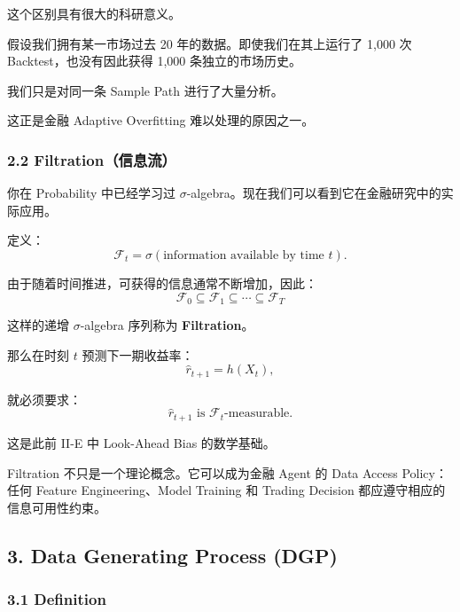 这个区别具有很大的科研意义。

假设我们拥有某一市场过去 20 年的数据。即使我们在其上运行了 1,000 次 Backtest，也没有因此获得 1,000 条独立的市场历史。

我们只是对同一条 Sample Path 进行了大量分析。

这正是金融 Adaptive Overfitting 难以处理的原因之一。

\hypertarget{part-4-52-0001-filtrationux4fe1ux606fux6d41}{%
\subsubsection{2.2 Filtration（信息流）}\label{part-4-52-0001-filtrationux4fe1ux606fux6d41}}

你在 Probability 中已经学习过 \(\sigma\)-algebra。现在我们可以看到它在金融研究中的实际应用。

定义：
\[\mathcal F_t
=
\sigma(\text{information available by time }t).\]

由于随着时间推进，可获得的信息通常不断增加，因此：
\[\boxed{
\mathcal F_0
\subseteq\mathcal F_1
\subseteq\cdots
\subseteq\mathcal F_T
}\]

这样的递增 \(\sigma\)-algebra 序列称为 \textbf{Filtration}。


那么在时刻 \(t\) 预测下一期收益率：
\[\hat r_{t+1}=h(X_t),\]

就必须要求：
\[\boxed{
\hat r_{t+1}
\text{ is }\mathcal F_t\text{-measurable}.
}\]

这是此前 II-E 中 Look-Ahead Bias 的数学基础。

Filtration 不只是一个理论概念。它可以成为金融 Agent 的 Data Access Policy：任何 Feature Engineering、Model Training 和 Trading Decision 都应遵守相应的信息可用性约束。

\hypertarget{part-4-52-0001-data-generating-process-dgp}{%
\subsection{3. Data Generating Process (DGP)}\label{part-4-52-0001-data-generating-process-dgp}}

\hypertarget{part-4-52-0001-definition}{%
\subsubsection{3.1 Definition}\label{part-4-52-0001-definition}}

